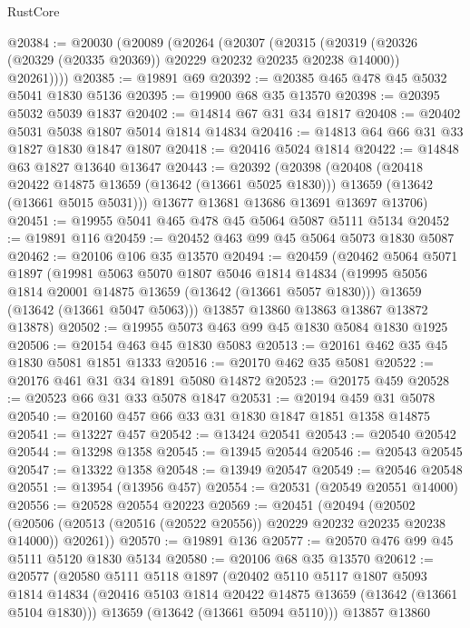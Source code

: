 \begin{lexlean}{RustCore}
\begin{coremodule}
@20384 := @20030
    (@20089
      (@20264
        (@20307
          (@20315
            (@20319 (@20326 (@20329 (@20335 @20369)) @20229 @20232 @20235 @20238 @14000))
            @20261))))
@20385 := @19891 @69
@20392 := @20385 @465 @478 @45 @5032 @5041 @1830 @5136
@20395 := @19900 @68 @35 @13570
@20398 := @20395 @5032 @5039 @1837
@20402 := @14814 @67 @31 @34 @1817
@20408 := @20402 @5031 @5038 @1807 @5014 @1814 @14834
@20416 := @14813 @64 @66 @31 @33 @1827 @1830 @1847 @1807
@20418 := @20416 @5024 @1814
@20422 := @14848 @63 @1827 @13640 @13647
@20443 := @20392
    (@20398
      (@20408
        (@20418 @20422 @14875 @13659 (@13642 (@13661 @5025 @1830)))
        @13659
        (@13642 (@13661 @5015 @5031)))
      @13677
      @13681
      @13686
      @13691
      @13697
      @13706)
@20451 := @19955 @5041 @465 @478 @45 @5064 @5087 @5111 @5134
@20452 := @19891 @116
@20459 := @20452 @463 @99 @45 @5064 @5073 @1830 @5087
@20462 := @20106 @106 @35 @13570
@20494 := @20459
    (@20462
      @5064
      @5071
      @1897
      (@19981
        @5063
        @5070
        @1807
        @5046
        @1814
        @14834
        (@19995 @5056 @1814 @20001 @14875 @13659 (@13642 (@13661 @5057 @1830)))
        @13659
        (@13642 (@13661 @5047 @5063)))
      @13857
      @13860
      @13863
      @13867
      @13872
      @13878)
@20502 := @19955 @5073 @463 @99 @45 @1830 @5084 @1830 @1925
@20506 := @20154 @463 @45 @1830 @5083
@20513 := @20161 @462 @35 @45 @1830 @5081 @1851 @1333
@20516 := @20170 @462 @35 @5081
@20522 := @20176 @461 @31 @34 @1891 @5080 @14872
@20523 := @20175 @459
@20528 := @20523 @66 @31 @33 @5078 @1847
@20531 := @20194 @459 @31 @5078
@20540 := @20160 @457 @66 @33 @31 @1830 @1847 @1851 @1358 @14875
@20541 := @13227 @457
@20542 := @13424 @20541
@20543 := @20540 @20542
@20544 := @13298 @1358
@20545 := @13945 @20544
@20546 := @20543 @20545
@20547 := @13322 @1358
@20548 := @13949 @20547
@20549 := @20546 @20548
@20551 := @13954 (@13956 @457)
@20554 := @20531 (@20549 @20551 @14000)
@20556 := @20528 @20554 @20223
@20569 := @20451
    (@20494
      (@20502 (@20506 (@20513 (@20516 (@20522 @20556)) @20229 @20232 @20235 @20238 @14000)) @20261))
@20570 := @19891 @136
@20577 := @20570 @476 @99 @45 @5111 @5120 @1830 @5134
@20580 := @20106 @68 @35 @13570
@20612 := @20577
    (@20580
      @5111
      @5118
      @1897
      (@20402
        @5110
        @5117
        @1807
        @5093
        @1814
        @14834
        (@20416 @5103 @1814 @20422 @14875 @13659 (@13642 (@13661 @5104 @1830)))
        @13659
        (@13642 (@13661 @5094 @5110)))
      @13857
      @13860

\end{coremodule}
\end{lexlean}
